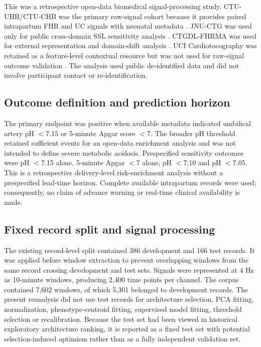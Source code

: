 \documentclass[utf8]{FrontiersinHarvard}
\begin{document}
This was a retrospective open-data biomedical signal-processing study. CTU-UHB/CTU-CHB was the primary raw-signal cohort because it provides paired intrapartum FHR and UC signals with neonatal metadata \citep{goldberger2000,chudacek2014,ctuuhb}. JNU-CTG was used only for public cross-domain SSL sensitivity analysis \citep{bai2026jnuctg}. CTGDL-FHRMA was used for external representation and domain-shift analysis \citep{ctgdl}. UCI Cardiotocography was retained as a feature-level contextual resource but was not used for raw-signal outcome validation \citep{uci}. The analysis used public de-identified data and did not involve participant contact or re-identification.

\subsection{Outcome definition and prediction horizon}

The primary endpoint was positive when available metadata indicated umbilical artery pH $<$7.15 or 5-minute Apgar score $<$7. The broader pH threshold retained sufficient events for an open-data enrichment analysis and was not intended to define severe metabolic acidosis. Prespecified sensitivity outcomes were pH $<$7.15 alone, 5-minute Apgar $<$7 alone, pH $<$7.10 and pH $<$7.05. This is a retrospective delivery-level risk-enrichment analysis without a prespecified lead-time horizon. Complete available intrapartum records were used; consequently, no claim of advance warning or real-time clinical availability is made.

\subsection{Fixed record split and signal processing}

The existing record-level split contained 386 development and 166 test records. It was applied before window extraction to prevent overlapping windows from the same record crossing development and test sets. Signals were represented at 4 Hz as 10-minute windows, producing 2,400 time points per channel. The corpus contained 7,602 windows, of which 5,301 belonged to development records. The present reanalysis did not use test records for architecture selection, PCA fitting, normalization, phenotype-centroid fitting, supervised model fitting, threshold selection or recalibration. Because the test set had been viewed in historical exploratory architecture ranking, it is reported as a fixed test set with potential selection-induced optimism rather than as a fully independent validation set.
\end{document}
